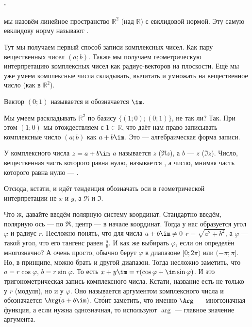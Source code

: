 \documentclass{article}
\begin{document}
    \paragraph{.}
    \begin{itemize}
        \dfn {} мы назовём линейное пространство $\mathbb R^2$ (над $\mathbb R$) с евклидовой нормой. Эту самую евклидову норму называют .
        \begin{Comment}
            Тут мы получаем первый способ записи комплексных чисел. Как пару вещественных чисел $(a;b)$. Также мы получаем геометрическую интерпретацию комплексных чисел как радиус-векторов на плоскости. Ещё мы уже умеем комплексные числа складывать, вычитать и умножать на вещественное число (как в $\mathbb R^2$).
        \end{Comment}
        \dfn Вектор $(0;1)$ называется  и обозначается $\im$.
        \begin{Comment}
            Мы умеем раскладывать $\mathbb R^2$ по базису $\{(1;0);(0;1)\}$, не так ли? Так. При этом $(1;0)$ мы отождествляем с $1\in\mathbb R$, что даёт нам право записывать комплексные число $(a;b)$ как $a+b\im$. Это --- алгебраическая форма записи.
        \end{Comment}
        \dfn У комплексного числа $z=a+b\im$ $a$ называется  $z$ ($\Re z$), а $b$ ---  $z$ ($\Im z$).
        \dfn Число, вещественная часть которого равна нулю, называется , а число, мнимая часть которого равна нулю --- .
        \begin{Comment}
            Отсюда, кстати, и идёт тенденция обозначать оси в геометрической интерпретации не $x$ и $y$, а $\Re$ и $\Im$.
        \end{Comment}
        \begin{Comment}
            Что ж, давайте введём полярную систему координат. Стандартно введём, полярную ось --- по $\Re$, центр --- в начале координат. Тогда у нас образуется угол $\varphi$ и радиус $r$. Несложно понять, что для числа $a+b\im\neq0$ $r=\sqrt{a^2+b^2}$, а $\varphi$ --- такой угол, что его тангенс равен $\frac ab$. И как же выбирать $\varphi$, если он определён многозначно? А очень просто, обычно берут $\varphi$ в диапазоне $[0;2\pi)$ или $(-\pi;\pi]$. Но, в принципе, можно брать и другой диапазон. Тогда несложно заметить, что $a=r\cos\varphi$, $b=r\sin\varphi$. То есть $x+y\im=r(\cos\varphi+\im\sin\varphi)$. И это тригонометрическая запись комплексного числа. Кстати, название есть не только у $r$ (модуля), но и у $\varphi$. Оно называется аргументом комплексного числа и обозначается $\Arg(a+b\im)$. Ст\'{о}ит заметить, что именно $\Arg$ --- многозначная функция, а если нужна однозначная, то используют $\arg$ --- главное значение аргумента.

\end{Comment}
\end{itemize}
\end{document}
